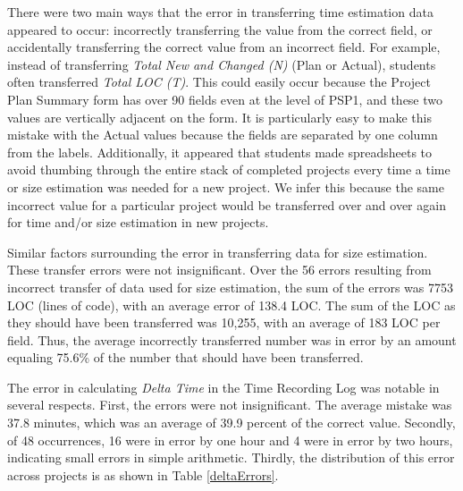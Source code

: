 There were two main ways that the error in transferring time estimation
data appeared to occur: incorrectly transferring the value from the correct
field, or accidentally transferring the correct value from an incorrect
field.  For example, instead of transferring {\it Total New and Changed
  (N)} (Plan or Actual), students often transferred {\it Total LOC (T)}.
This could easily occur because the Project Plan Summary form has over 90
fields even at the level of PSP1, and these two values are vertically
adjacent on the form. It is particularly easy to make this mistake with the
Actual values because the fields are separated by one column from the
labels.  Additionally, it appeared that students made spreadsheets to avoid
thumbing through the entire stack of completed projects every time a time
or size estimation was needed for a new project.  We infer this because the
same incorrect value for a particular project would be transferred over and
over again for time and/or size estimation in new projects.
    
Similar factors surrounding the error in transferring data for size
estimation.  These transfer errors were not insignificant.  Over the 56
errors resulting from incorrect transfer of data used for size estimation,
the sum of the errors was 7753 LOC (lines of code), with an average error
of 138.4 LOC.  The sum of the LOC as they should have been transferred was
10,255, with an average of 183 LOC per field.  Thus, the average
incorrectly transferred number was in error by an amount equaling 75.6\% of
the number that should have been transferred.
    
The error in calculating {\it Delta Time} in the Time Recording Log was
notable in several respects.  First, the errors were not insignificant.
The average mistake was 37.8 minutes, which was an average of 39.9 percent
of the correct value. Secondly, of 48 occurrences, 16 were in error by one
hour and 4 were in error by two hours, indicating small errors in simple
arithmetic. Thirdly, the distribution of this error across projects is as
shown in Table \ref{deltaErrors}.

